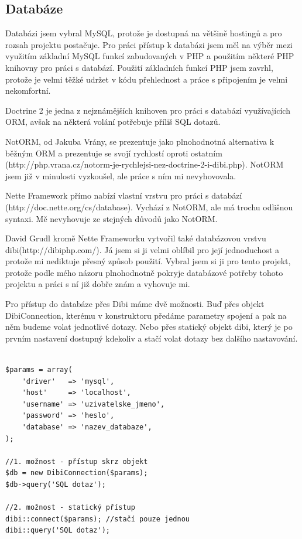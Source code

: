 \documentclass[thesis=B,czech]{FITthesis}[2011/06/14]
\begin{document}
\subsection{Databáze}
Databázi jsem vybral MySQL, protože je dostupná na většině hostingů a pro rozsah projektu postačuje. Pro práci přístup k databázi jsem měl na výběr mezi využitím základní MySQL funkcí zabudovaných v PHP a použitím některé PHP knihovny pro práci s databází. Použití základních funkcí PHP jsem zavrhl, protože je velmi těžké udržet v kódu přehlednost a práce s připojením je velmi nekomfortní.  

Doctrine 2 je jedna z nejznámějších knihoven pro práci s databází využívajících ORM, avšak na některá volání potřebuje příliš SQL dotazů.

NotORM, od Jakuba Vrány, se prezentuje jako plnohodnotná alternativa k běžným ORM a prezentuje se svojí rychlostí oproti ostatním (http://php.vrana.cz/notorm-je-rychlejsi-nez-doctrine-2-i-dibi.php). NotORM jsem již v minulosti vyzkoušel, ale práce s ním mi nevyhovovala. 

Nette Framework přímo nabízí vlastní vrstvu pro práci s databází (http://doc.nette.org/cs/database). Vychází z NotORM, ale má trochu odlišnou syntaxi. Mě nevyhovuje ze stejných důvodů jako NotORM.

David Grudl kromě Nette Frameworku vytvořil také databázovou vrstvu dibi(http://dibiphp.com/). Já jsem si ji velmi oblíbil pro její jednoduchost a protože mi nediktuje přesný způsob použití. Vybral jsem si ji pro tento projekt, protože podle mého názoru plnohodnotně pokryje databázové potřeby tohoto projektu a práci s ní již dobře znám a vyhovuje mi.

Pro přístup do databáze přes Dibi máme dvě možnosti. Buď přes objekt DibiConnection, kterému v konstruktoru předáme parametry spojení a pak na něm budeme volat jednotlivé dotazy. Nebo přes statický objekt dibi, který je po prvním nastavení dostupný kdekoliv a stačí volat dotazy bez dalšího nastavování.

\begin{verbatim}

$params = array(
    'driver'   => 'mysql',
    'host'     => 'localhost',
    'username' => 'uzivatelske_jmeno',
    'password' => 'heslo',
    'database' => 'nazev_databaze',
);

//1. možnost - přístup skrz objekt
$db = new DibiConnection($params);
$db->query('SQL dotaz');

//2. možnost - statický přístup
dibi::connect($params); //stačí pouze jednou
dibi::query('SQL dotaz');

\end{verbatim}
\end{document}
